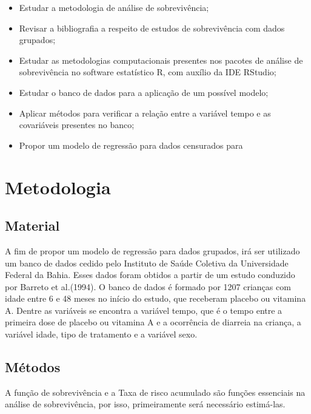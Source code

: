 \documentclass[a4paper,12pt]{article}
\begin{document}
\begin{itemize}
	
	\item Estudar a metodologia de análise de sobrevivência;
	\item Revisar a bibliografia a respeito de estudos de sobrevivência com dados grupados;	
	\item Estudar as metodologias computacionais presentes nos pacotes de análise de sobrevivência no software estatístico R, com auxílio da IDE RStudio;
	\item Estudar o banco de dados para a aplicação de um possível modelo;
	\item Aplicar métodos para verificar a relação entre a variável tempo e as covariáveis presentes no banco;
	\item Propor um modelo de regressão para dados censurados para 
\end{itemize}

\vspace{1cm}
\newpage
\section{Metodologia}
\noindent

\subsection{Material}

A fim de propor um modelo de regressão para dados grupados, irá ser utilizado um banco de dados cedido pelo Instituto de Saúde Coletiva da Universidade Federal da Bahia. Esses dados foram obtidos a partir de um estudo conduzido por Barreto et al.(1994). O banco de dados é formado por 1207 crianças com idade entre 6 e 48 meses no início do estudo, que receberam placebo ou vitamina A. Dentre as variáveis se encontra a variável tempo, que é o tempo entre a primeira dose de placebo ou vitamina A e a ocorrência de diarreia na criança, a variável idade, tipo de tratamento e a variável sexo.

\subsection{Métodos}

A função de sobrevivência e a Taxa de risco acumulado são funções essenciais na análise de sobrevivência, por isso, primeiramente será necessário estimá-las.
\end{document}
